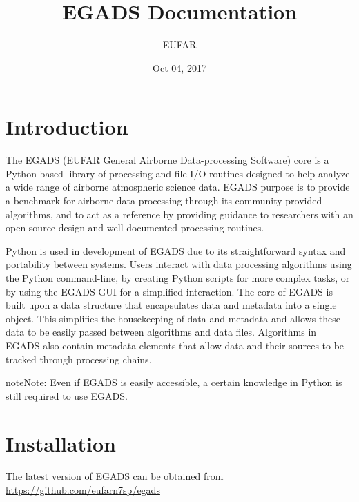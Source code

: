\documentclass[a4paper,10pt,openany,english]{sphinxmanual}
\title{EGADS Documentation}
\date{Oct 04, 2017}
\author{EUFAR}
\begin{document}
\maketitle
\sphinxtableofcontents
{}\label{index::doc}



\chapter{Introduction}
\label{intro:introduction}\label{intro:welcome-to-egads-s-documentation}\label{intro::doc}
The EGADS (EUFAR General Airborne Data-processing Software) core is a Python-based library of processing and file I/O routines designed to help analyze a wide range of airborne atmospheric science data. EGADS purpose is to provide a benchmark for airborne data-processing through its community-provided algorithms, and to act as a reference by providing guidance to researchers with an open-source design and well-documented processing routines.

Python is used in development of EGADS due to its straightforward syntax and portability between systems. Users interact with data processing algorithms using the Python command-line, by creating Python scripts for more complex tasks, or by using the EGADS GUI for a simplified interaction. The core of EGADS is built upon a data structure that encapsulates data and metadata into a single object. This simplifies the housekeeping of data and metadata and allows these data to be easily passed between algorithms and data files. Algorithms in EGADS also contain metadata elements that allow data and their sources to be tracked through processing chains.

\begin{sphinxadmonition}{note}{Note:}
Even if EGADS is easily accessible, a certain knowledge in Python is still required to use EGADS.
\end{sphinxadmonition}


\chapter{Installation}
\label{install:installation}\label{install::doc}
The latest version of EGADS can be obtained from \url{https://github.com/eufarn7sp/egads}
\end{document}
